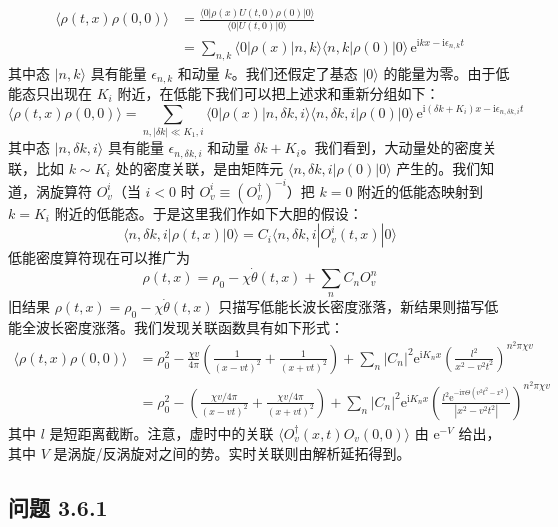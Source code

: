 \begin{align*}
\langle\rho(t,x)\rho(0,0)\rangle&=\frac{\langle0|\rho(x)U(t,0)\rho(0)|0\rangle}{\langle0|U(t,0)|0\rangle}\\
&=\sum_{n,k}\langle0|\rho(x)|n,k\rangle\langle n,k|\rho(0)|0\rangle\,\mathrm{e}^{\mathrm{i}kx-\mathrm{i}\epsilon_{n,k}t}
\end{align*}
其中态 $|n,k\rangle$ 具有能量 $\epsilon_{n,k}$ 和动量 $k$。我们还假定了基态 $|0\rangle$ 的能量为零。由于低能态只出现在 $K_i$ 附近，在低能下我们可以把上述求和重新分组如下：
\begin{equation*}
\langle\rho(t,x)\rho(0,0)\rangle=\sum_{n,|\delta k|\ll K_1,i}\langle0|\rho(x)|n,\delta k,i\rangle\langle n,\delta k,i|\rho(0)|0\rangle\,\mathrm{e}^{\mathrm{i}(\delta k+K_i)x-\mathrm{i}\epsilon_{n,\delta k,i}t}
\end{equation*}
其中态 $|n,\delta k,i\rangle$ 具有能量 $\epsilon_{n,\delta k,i}$ 和动量 $\delta k+K_i$。我们看到，大动量处的密度关联，比如 $k\sim K_i$ 处的密度关联，是由矩阵元 $\langle n,\delta k,i|\rho(0)|0\rangle$ 产生的。我们知道，涡旋算符 $O_v^i$（当 $i<0$ 时 $O_v^i\equiv(O_v^\dagger)^{-i}$）把 $k=0$ 附近的低能态映射到 $k=K_i$ 附近的低能态。于是这里我们作如下大胆的假设：
\begin{equation*}
\langle n,\delta k,i|\rho(t,x)|0\rangle=C_i\langle n,\delta k,i|O_v^i(t,x)|0\rangle
\end{equation*}
低能密度算符现在可以推广为
\begin{equation*}
\rho(t,x)=\rho_0-\chi\dot{\theta}(t,x)+\sum_n C_nO_v^n
\end{equation*}
旧结果 $\rho(t,x)=\rho_0-\chi\dot{\theta}(t,x)$ 只描写低能长波长密度涨落，新结果则描写低能全波长密度涨落。我们发现关联函数具有如下形式：
\begin{align*}
\langle\rho(t,x)\rho(0,0)\rangle
&=\rho_0^2-\frac{\chi v}{4\pi}\left(\frac{1}{(x-vt)^2}+\frac{1}{(x+vt)^2}\right)+\sum_n|C_n|^2\mathrm{e}^{\mathrm{i}K_nx}\left(\frac{l^2}{x^2-v^2t^2}\right)^{n^2\pi\chi v}\\
&=\rho_0^2-\left(\frac{\chi v/4\pi}{(x-vt)^2}+\frac{\chi v/4\pi}{(x+vt)^2}\right)+\sum_n|C_n|^2\mathrm{e}^{\mathrm{i}K_nx}\left(\frac{l^2\mathrm{e}^{-\mathrm{i}\pi\Theta(v^2t^2-x^2)}}{|x^2-v^2t^2|}\right)^{n^2\pi\chi v}\tag{3.6.2}
\end{align*}
其中 $l$ 是短距离截断。注意，虚时中的关联 $\langle O_v^\dagger(x,t)O_v(0,0)\rangle$ 由 $\mathrm{e}^{-V}$ 给出，其中 $V$ 是涡旋/反涡旋对之间的势。实时关联则由解析延拓得到。

\subsection*{问题 3.6.1}

